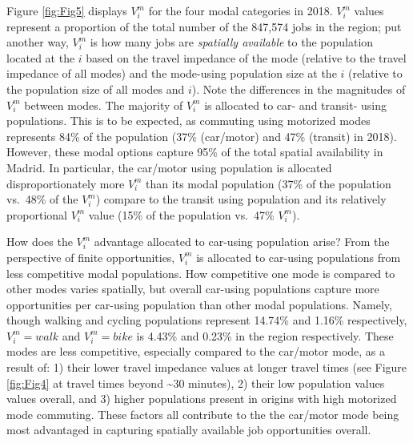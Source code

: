 \documentclass[]{trbunofficial}
\begin{document}
Figure \ref{fig:Fig5} displays \(V_i^m\) for the four modal categories
in 2018. \(V_i^m\) values represent a proportion of the total number of
the 847,574 jobs in the region; put another way, \(V_i^m\) is how many
jobs are \emph{spatially available} to the population located at the
\(i\) based on the travel impedance of the mode (relative to the travel
impedance of all modes) and the mode-using population size at the \(i\)
(relative to the population size of all modes and \(i\)). Note the
differences in the magnitudes of \(V_i^m\) between modes. The majority
of \(V_i^m\) is allocated to car- and transit- using populations. This
is to be expected, as commuting using motorized modes represents 84\% of
the population (37\% (car/motor) and 47\% (transit) in 2018). However,
these modal options capture 95\% of the total spatial availability in
Madrid. In particular, the car/motor using population is allocated
disproportionately more \(V_i^m\) than its modal population (37\% of the
population vs.~48\% of the \(V_i^m\)) compare to the transit using
population and its relatively proportional \(V_i^m\) value (15\% of the
population vs.~47\% \(V_i^m\)).

How does the \(V_i^m\) advantage allocated to car-using population
arise? From the perspective of finite opportunities, \(V_i^m\) is
allocated to car-using populations from less competitive modal
populations. How competitive one mode is compared to other modes varies
spatially, but overall car-using populations capture more opportunities
per car-using population than other modal populations. Namely, though
walking and cycling populations represent 14.74\% and 1.16\%
respectively, \(V_i^m={walk}\) and \(V_i^m={bike}\) is 4.43\% and 0.23\%
in the region respectively. These modes are less competitive, especially
compared to the car/motor mode, as a result of: 1) their lower travel
impedance values at longer travel times (see Figure \ref{fig:Fig4} at
travel times beyond \textasciitilde30 minutes), 2) their low population
values values overall, and 3) higher populations present in origins with
high motorized mode commuting. These factors all contribute to the the
car/motor mode being most advantaged in capturing spatially available
job opportunities overall.
\end{document}

